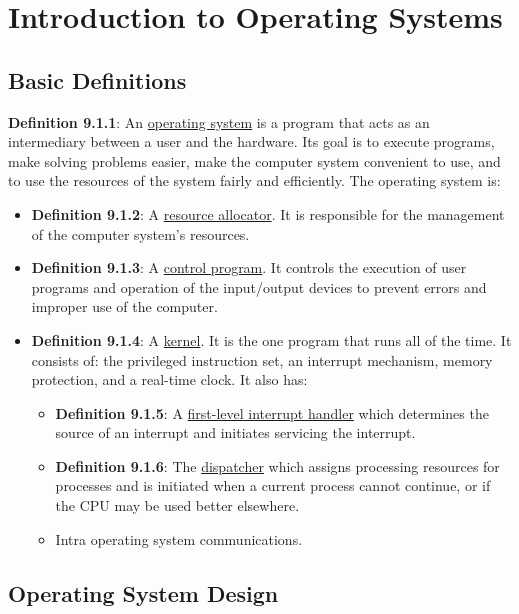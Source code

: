 \documentclass{article}
\newcommand{\definition}[2]{\textbf{Definition #1}: #2\label{def:#1}}
\begin{document}
\section{Introduction to Operating Systems}

\subsection{Basic Definitions}

\definition{9.1.1}{An \underline{operating system} is a program that acts as an intermediary between a user and the hardware. Its goal is to execute programs, make solving problems easier, make the computer system convenient to use, and to use the resources of the system fairly and efficiently. The operating system is:}
\begin{itemize}
    \item \definition{9.1.2}{A \underline{resource allocator}. It is responsible for the management of the computer system's resources.}
    \item \definition{9.1.3}{A \underline{control program}. It controls the execution of user programs and operation of the input/output devices to prevent errors and improper use of the computer.}
    \item \definition{9.1.4}{A \underline{kernel}. It is the one program that runs all of the time. It consists of: the privileged instruction set, an interrupt mechanism, memory protection, and a real-time clock. It also has:}
    \begin{itemize}
        \item \definition{9.1.5}{A \underline{first-level interrupt handler} which determines the source of an interrupt and initiates servicing the interrupt.}
        \item \definition{9.1.6}{The \underline{dispatcher} which assigns processing resources for processes and is initiated when a current process cannot continue, or if the CPU may be used better elsewhere.}
        \item Intra operating system communications.
    \end{itemize}
\end{itemize}

\subsection{Operating System Design}
\end{document}
